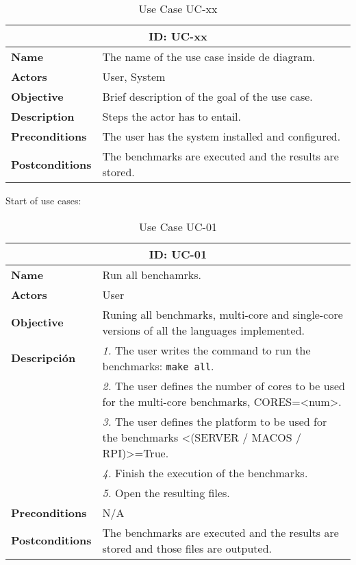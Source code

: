 \begin{table}[H]
    \centering
    \begin{tabular}{l p{10cm}}
        \toprule
        \multicolumn{2}{c}{\textbf{ID: UC-xx}} \\
        \toprule
        \textbf{Name}               &  The name of the use case inside de diagram. \\
        \textbf{Actors}             &  User, System \\
        \textbf{Objective}          &  Brief description of the goal of the use case. \\
        \textbf{Description}        &  Steps the actor has to entail. \\
        \textbf{Preconditions}      &  The user has the system installed and configured. \\
        \textbf{Postconditions}     &  The benchmarks are executed and the results are stored. \\
    \end{tabular}
    \caption{Use Case UC-xx}
    \label{tab:uc-xx}
\end{table}

Start of use cases:
\begin{table}[H]
    \centering
    \begin{tabular}{l p{10cm}}
        \toprule
        \multicolumn{2}{c}{\textbf{ID: UC-01}} \\
        \toprule
        \textbf{Name}                         &  Run all benchamrks. \\
        \textbf{Actors}                       &  User \\
        \textbf{Objective}                    &  Runing all benchmarks, multi-core and single-core versions of all the languages implemented. \\
        \multirow{1}{*}{\textbf{Descripción}} & \textsl{1.} The user writes the command to run the benchmarks: \texttt{make all}.\\
                                              & \textsl{2.} The user defines the number of cores to be used for the multi-core benchmarks, CORES=<num>.\\
                                              & \textsl{3.} The user defines the platform to be used for the benchmarks <(SERVER / MACOS / RPI)>=True.\\
                                              & \textsl{4.} Finish the execution of the benchmarks.\\
                                              & \textsl{5.} Open the resulting files.\\ 
        \textbf{Preconditions}                &  N/A \\
        \textbf{Postconditions}               &  The benchmarks are executed and the results are stored and those files are outputed. \\
    \end{tabular}
    \caption{Use Case UC-01}
    \label{tab:uc-01}
\end{table}

